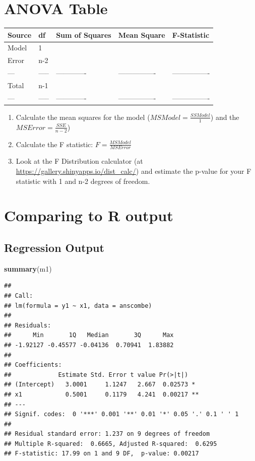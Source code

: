 \documentclass[]{article}
\newenvironment{Shaded}{\begin{snugshade}}{\end{snugshade}}
\newcommand{\KeywordTok}[1]{\textcolor[rgb]{0.13,0.29,0.53}{\textbf{#1}}}
\newcommand{\NormalTok}[1]{#1}
\begin{document}
\hypertarget{anova-table}{%
\section{ANOVA Table}\label{anova-table}}

\begin{longtable}[]{@{}lllll@{}}
\toprule
Source & df & Sum of Squares & Mean Square & F-Statistic\tabularnewline
\midrule
\endhead
Model & 1 & & &\tabularnewline
Error & n-2 & & &\tabularnewline
--- & ----- & ------------- & ---------------- &
----------------\tabularnewline
Total & n-1 & & &\tabularnewline
--- & ----- & ------------- & ---------------- &
----------------\tabularnewline
\bottomrule
\end{longtable}

\begin{enumerate}
\def\labelenumi{\arabic{enumi}.}
\item
  Calculate the mean squares for the model
  (\(MSModel = \frac{SSModel}{1}\)) and the
  \(MSError = \frac{SSE}{n-2}\)) \vspace{1 in}
\item
  Calculate the F statistic: \(F = \frac{MSModel}{MSError}\)
  \vspace{1 in}
\item
  Look at the F Distribution calculator (at
  \url{https://gallery.shinyapps.io/dist_calc/}) and estimate the
  p-value for your F statistic with 1 and n-2 degrees of freedom.
\end{enumerate}

\newpage

\hypertarget{comparing-to-r-output}{%
\section{Comparing to R output}\label{comparing-to-r-output}}

\hypertarget{regression-output-1}{%
\subsection{Regression Output}\label{regression-output-1}}

\begin{Shaded}
\begin{Highlighting}[]
\KeywordTok{summary}\NormalTok{(m1)}
\end{Highlighting}
\end{Shaded}

\begin{verbatim}
## 
## Call:
## lm(formula = y1 ~ x1, data = anscombe)
## 
## Residuals:
##      Min       1Q   Median       3Q      Max 
## -1.92127 -0.45577 -0.04136  0.70941  1.83882 
## 
## Coefficients:
##             Estimate Std. Error t value Pr(>|t|)   
## (Intercept)   3.0001     1.1247   2.667  0.02573 * 
## x1            0.5001     0.1179   4.241  0.00217 **
## ---
## Signif. codes:  0 '***' 0.001 '**' 0.01 '*' 0.05 '.' 0.1 ' ' 1
## 
## Residual standard error: 1.237 on 9 degrees of freedom
## Multiple R-squared:  0.6665, Adjusted R-squared:  0.6295 
## F-statistic: 17.99 on 1 and 9 DF,  p-value: 0.00217
\end{verbatim}
\end{document}
